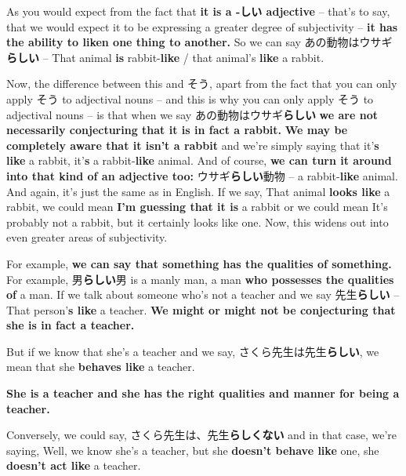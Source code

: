 As you would expect from the fact that {\bf it is a -しい adjective} -- that's to say, that we would expect it to be expressing a greater degree of subjectivity -- {\bf it has the ability to liken one thing to another.} So we can say あの動物はウサギ{\bf らしい} -- That animal {\bf is} rabbit-{\bf like} / that animal's {\bf like} a rabbit.

\thinrule

Now, the difference between this and そう, apart from the fact that you can only apply そう to adjectival nouns -- and this is why you can only apply そう to adjectival nouns -- is that when we say あの動物はウサギ{\bf らしい} {\bf we are not necessarily conjecturing that it is in fact a rabbit.} {\bf We may be completely aware that it isn't a rabbit} and we're simply saying that it'{\bf s like} a rabbit, it'{\bf s} a rabbit-{\bf like} animal. And of course, {\bf we can turn it around into that kind of an adjective too:} ウサギ{\bf らしい}動物 -- a rabbit-{\bf like} animal. And again, it's just the same as in English. If we say, That animal {\bf looks like} a rabbit, we could mean {\bf I'm guessing that it is} a rabbit or we could mean It's probably not a rabbit, but it certainly looks like one. Now, this widens out into even greater areas of subjectivity.

\stopsectionlevel

\startsectionlevel[title={らしい for more subjective areas},reference={らしい-for-more-subjective-areas}]

For example, {\bf we can say that something has the qualities of something.} For example, 男{\bf らしい}男 is a manly man, a man {\bf who possesses the qualities of} a man. If we talk about someone who's not a teacher and we say 先生{\bf らしい} -- That person'{\bf s like} a teacher. {\bf We might or might not be conjecturing that she is in fact a teacher.}

\thinrule

But if we know that she's a teacher and we say, さくら先生は先生{\bf らしい}, we mean that she {\bf behaves like} a teacher.

{}

{\bf She is a teacher and she has the right qualities and manner for being a teacher.}

\thinrule

Conversely, we could say, さくら先生は、先生{\bf らしくない} and in that case, we're saying, Well, we know she's a teacher, but she {\bf doesn't behave like} one, she {\bf doesn't act like} a teacher.

